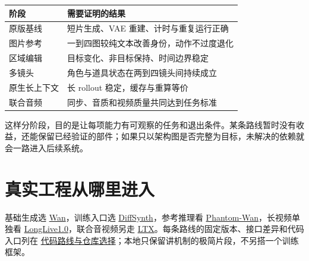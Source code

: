 {\def\LTcaptype{table} %
\small\setlength{\tabcolsep}{3pt}\renewcommand{\arraystretch}{1.18}
\begin{longtable}[]{@{}
  >{\raggedright\arraybackslash}p{}
  >{\raggedright\arraybackslash}p{}@{}}
\toprule\noalign{}
\begin{minipage}[b]{\linewidth}\raggedright
阶段
\end{minipage} & \begin{minipage}[b]{\linewidth}\raggedright
需要证明的结果
\end{minipage} \\
\midrule\noalign{}
\endhead
\bottomrule\noalign{}
\endlastfoot
原版基线 & 短片生成、VAE 重建、计时与重复运行正确 \\
图片参考 & 一到四图较纯文本改善身份，动作不过度退化 \\
区域编辑 & 目标变化、非目标保持、时间边界稳定 \\
多镜头 & 角色与道具状态在两到四镜头间持续成立 \\
原生长上下文 & 长 rollout 稳定，缓存与重算等价 \\
联合音频 & 同步、音质和视频质量共同达到任务标准 \\
\end{longtable}
}

这样分阶段，目的是让每项能力有可观察的任务和退出条件。某条路线暂时没有收益，还能保留已经验证的部件；如果只以架构图是否完整为目标，未解决的依赖就会一路进入后续系统。

\section{真实工程从哪里进入}\label{seedance-m12-ux771fux5b9eux5de5ux7a0bux4eceux54eaux91ccux8fdbux5165}

基础生成选 \href{https://github.com/Wan-Video/Wan2.1}{Wan}，训练入口选 \href{https://github.com/modelscope/DiffSynth-Studio}{DiffSynth}，参考推理看 \href{https://github.com/Phantom-video/Phantom}{Phantom-Wan}，长视频单独看 \href{https://github.com/NVlabs/LongLive/blob/31c70d9071cd7851d82939806dc9fac645fcabe5/LongLive1.0/inference.py}{LongLive1.0}，联合音视频另走 \href{https://github.com/Lightricks/LTX-2}{LTX}。每条路线的固定版本、接口差异和代码入口列在 \hyperref[seedance-m15]{代码路线与仓库选择}；本地只保留讲机制的极简片段，不另搭一个训练框架。
